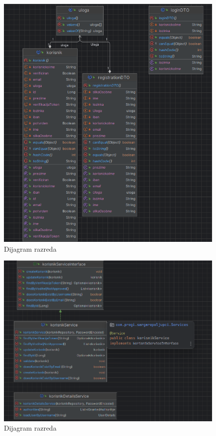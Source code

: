 			\begin{figure}[H]
				\includegraphics[width=\textwidth]{slike/dijagram_razred2.PNG} %
				\centering
				\caption{Dijagram razreda}
				\label{fig:dijagramrazreda2}
			\end{figure}
			
			\begin{figure}[H]
				\includegraphics[width=\textwidth]{slike/dijagram_razred3.PNG} %
				\centering
				\caption{Dijagram razreda}
				\label{fig:dijagramrazreda3}
			\end{figure}
			
